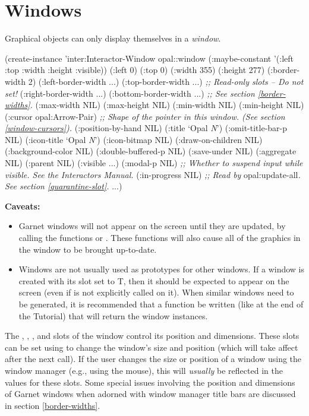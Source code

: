 \chapter{Windows}
\label{windows}

Graphical objects can only display themselves in a {\it window}.

\begin{programexample}
(create-instance 'inter:Interactor-Window opal::window
  (:maybe-constant '(:left :top :width :height :visible))
  (:left 0)
  (:top 0)
  (:width 355)
  (:height 277)
  (:border-width 2)
  (:left-border-width ...) (:top-border-width ...)     {\it ;; Read-only slots -- Do not set!}
  (:right-border-width ...) (:bottom-border-width ...) {\it ;; See section \ref{border-widths}.}
  (:max-width NIL) (:max-height NIL)
  (:min-width NIL) (:min-height NIL)
  (:cursor opal:Arrow-Pair)    {\it ;; Shape of the pointer in this window.  (See section \ref{window-cursors}).}
  (:position-by-hand NIL)
  (:title `Opal {\it N}')
  (:omit-title-bar-p NIL)
  (:icon-title `Opal {\it N}')
  (:icon-bitmap NIL)
  (:draw-on-children NIL)
  (:background-color NIL)
  (:double-buffered-p NIL)
  (:save-under NIL)
  (:aggregate NIL)
  (:parent NIL)
  (:visible ...)
  (:modal-p NIL)               {\it ;; Whether to suspend input while visible.  See the Interactors Manual.}
  (:in-progress NIL)           {\it ;; Read by }opal:update-all{\it .  See section \ref{quarantine-slot}.}
  ...)
\end{programexample}

{\bf Caveats:}
\begin{itemize}
\item Garnet windows will not appear on the screen until they are
updated, by calling the functions  or .
These functions will also cause all of the graphics in the window to be
brought up-to-date.

\item Windows are not usually used as prototypes for other windows.  If a window
is created with its  slot set to T, then it should be expected
to appear on the screen (even if  is not explicitly called
on it).  When similar windows need to be generated, it is recommended that
a function be written (like at the end of the Tutorial) that will return
the window instances.
\end{itemize}


The , , , and  slots of the
window control its position and dimensions.
These slots can be set using  to change the window's
size and position (which will take affect after the next  call).
If the user changes the size or position of a window using the window manager
(e.g., using the mouse), this will {\it usually} be reflected in the values
for these slots.  Some special issues involving the position and
dimensions of Garnet windows when adorned with window manager title bars are
discussed in section \ref{border-widths}.

